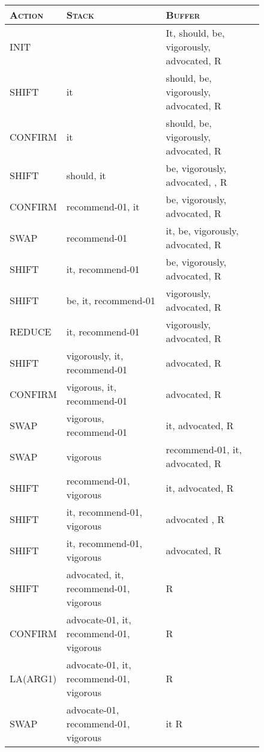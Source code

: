 \documentclass[11pt,a4paper]{article}
\begin{document}
 \begin{figure}[!ht]

  \begin{center}
    \centering
    \begin{tiny}
      
   \setlength{\tabcolsep}{0.85pt}     \renewcommand{\arraystretch}{1}
      \begin{tabular}{l|l|l}\textsc{Action}&\textsc{Stack}&\textsc{Buffer}\\
      \hline
               INIT &&It, should, be, vigorously, advocated, R\\
               SHIFT &it&should, be, vigorously, advocated, R\\
               CONFIRM &it&should, be, vigorously, advocated, R \\
               SHIFT &should, it&be, vigorously, advocated, , R \\
               CONFIRM &recommend-01, it&be, vigorously, advocated, R \\
               SWAP&recommend-01&it, be, vigorously, advocated, R\\
               SHIFT &it, recommend-01&be, vigorously, advocated, R \\
               SHIFT&be, it, recommend-01&vigorously, advocated, R \\
               REDUCE &it, recommend-01&vigorously, advocated, R \\
               SHIFT &vigorously, it, recommend-01&advocated, R \\
               CONFIRM &vigorous, it, recommend-01&advocated, R \\
               SWAP &vigorous, recommend-01&it, advocated, R\\
               SWAP&vigorous&recommend-01, it, advocated, R \\
               SHIFT &recommend-01, vigorous&it, advocated, R \\
               SHIFT &it, recommend-01, vigorous&advocated , R\\
               SHIFT  & it, recommend-01, vigorous&advocated, R\\
               SHIFT &advocated, it, recommend-01, vigorous& R\\
               CONFIRM  &advocate-01, it, recommend-01, vigorous& R\\
               LA(ARG1)  &advocate-01, it, recommend-01, vigorous& R\\
               SWAP &advocate-01,  recommend-01, vigorous&it R\\

\end{tabular}
\end{tiny}
\end{center}
\end{figure}
\end{document}
